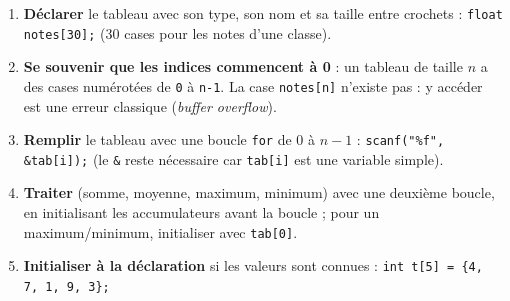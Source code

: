 \documentclass[11pt]{article}
\begin{document}
\begin{methode}
\begin{enumerate}
\item \textbf{Déclarer} le tableau avec son type, son nom et sa taille entre crochets : \texttt{float notes[30];} (30 cases pour les notes d'une classe).
\item \textbf{Se souvenir que les indices commencent à 0} : un tableau de taille $n$ a des cases numérotées de \texttt{0} à \texttt{n-1}. La case \texttt{notes[n]} n'existe pas : y accéder est une erreur classique (\emph{buffer overflow}).
\item \textbf{Remplir} le tableau avec une boucle \texttt{for} de 0 à $n-1$ : \texttt{scanf("\%f", \&tab[i]);} (le \texttt{\&} reste nécessaire car \texttt{tab[i]} est une variable simple).
\item \textbf{Traiter} (somme, moyenne, maximum, minimum) avec une deuxième boucle, en initialisant les accumulateurs avant la boucle ; pour un maximum/minimum, initialiser avec \texttt{tab[0]}.
\item \textbf{Initialiser à la déclaration} si les valeurs sont connues : \texttt{int t[5] = \{4, 7, 1, 9, 3\};}
\end{enumerate}
\end{methode}
\end{document}

